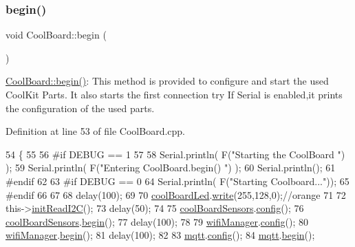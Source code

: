 \subsubsection{\texorpdfstring{begin()}{begin()}}
{\footnotesize\ttfamily void Cool\+Board\+::begin (\begin{DoxyParamCaption}{ }\end{DoxyParamCaption})}

\hyperlink{class_cool_board_acba7c5aef7268b2c0044bdb54d3b9d76}{Cool\+Board\+::begin()}\+: This method is provided to configure and start the used Cool\+Kit Parts. It also starts the first connection try If Serial is enabled,it prints the configuration of the used parts. 

Definition at line 53 of file Cool\+Board.\+cpp.


\begin{DoxyCode}
54 \{
55 
56 \textcolor{preprocessor}{#if DEBUG == 1}
57 
58     Serial.println( F(\textcolor{stringliteral}{"Starting the CoolBoard  "})  );
59     Serial.println( F(\textcolor{stringliteral}{"Entering CoolBoard.begin() "})  );
60     Serial.println();
61 \textcolor{preprocessor}{#endif  }
62 
63 \textcolor{preprocessor}{#if DEBUG == 0}
64     Serial.println( F(\textcolor{stringliteral}{"Starting Coolboard..."}));
65 \textcolor{preprocessor}{#endif}
66 
67 
68     delay(100);
69     
70     \hyperlink{class_cool_board_a1b1d3c684a5baa56b08486e192fd8e97}{coolBoardLed}.\hyperlink{class_cool_board_led_a30fadd4cbec17ceea428bf7a32207e87}{write}(255,128,0);\textcolor{comment}{//orange}
71 
72     this->\hyperlink{class_cool_board_a397b46fadab8f530a8cf4d914c561366}{initReadI2C}();
73     delay(50);
74 
75     \hyperlink{class_cool_board_af102be5288bd7f7a8e59b13f86e26a00}{coolBoardSensors}.\hyperlink{class_cool_board_sensors_a9a218895c5423375c33c08f2c56fb23a}{config}();
76     \hyperlink{class_cool_board_af102be5288bd7f7a8e59b13f86e26a00}{coolBoardSensors}.\hyperlink{class_cool_board_sensors_a97095823ef7c8f5290812f1405b966b3}{begin}();
77     delay(100);
78     
79     \hyperlink{class_cool_board_acd88e6003606b47479ebba81e4aceeca}{wifiManager}.\hyperlink{class_cool_wifi_a4eb2f6b9b09dd588964b88b6c70122c0}{config}();
80     \hyperlink{class_cool_board_acd88e6003606b47479ebba81e4aceeca}{wifiManager}.\hyperlink{class_cool_wifi_a46942fed90e475112cc10b78a32e7aaa}{begin}();
81     delay(100);
82 
83     \hyperlink{class_cool_board_a2399f44d7c23c1149a335cb3b46d90f1}{mqtt}.\hyperlink{class_cool_m_q_t_t_a9b703de4f1358f0ee7a5e8c44979c648}{config}();
84     \hyperlink{class_cool_board_a2399f44d7c23c1149a335cb3b46d90f1}{mqtt}.\hyperlink{class_cool_m_q_t_t_ac9248808641ebf3054ed0620ea9d0100}{begin}();

\end{DoxyCode}
